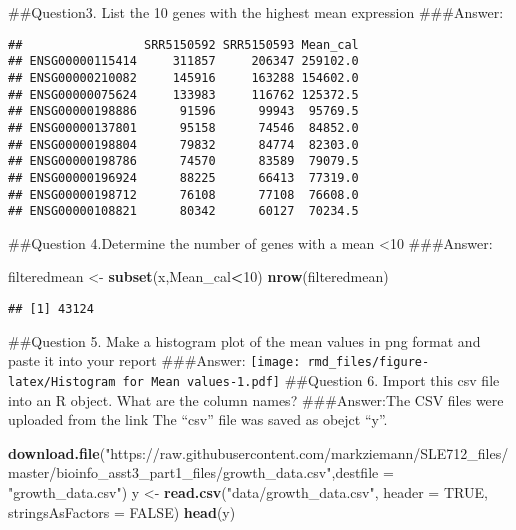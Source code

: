 \documentclass[]{article}
\newenvironment{Shaded}{\begin{snugshade}}{\end{snugshade}}
\newcommand{\DataTypeTok}[1]{\textcolor[rgb]{0.13,0.29,0.53}{#1}}
\newcommand{\DecValTok}[1]{\textcolor[rgb]{0.00,0.00,0.81}{#1}}
\newcommand{\KeywordTok}[1]{\textcolor[rgb]{0.13,0.29,0.53}{\textbf{#1}}}
\newcommand{\NormalTok}[1]{#1}
\newcommand{\OperatorTok}[1]{\textcolor[rgb]{0.81,0.36,0.00}{\textbf{#1}}}
\newcommand{\OtherTok}[1]{\textcolor[rgb]{0.56,0.35,0.01}{#1}}
\newcommand{\StringTok}[1]{\textcolor[rgb]{0.31,0.60,0.02}{#1}}
\begin{document}
\#\#Question3. List the 10 genes with the highest mean expression
\#\#\#Answer:

\begin{Shaded}
\end{Shaded}

\begin{verbatim}
##                 SRR5150592 SRR5150593 Mean_cal
## ENSG00000115414     311857     206347 259102.0
## ENSG00000210082     145916     163288 154602.0
## ENSG00000075624     133983     116762 125372.5
## ENSG00000198886      91596      99943  95769.5
## ENSG00000137801      95158      74546  84852.0
## ENSG00000198804      79832      84774  82303.0
## ENSG00000198786      74570      83589  79079.5
## ENSG00000196924      88225      66413  77319.0
## ENSG00000198712      76108      77108  76608.0
## ENSG00000108821      80342      60127  70234.5
\end{verbatim}

\#\#Question 4.Determine the number of genes with a mean \textless{}10
\#\#\#Answer:

\begin{Shaded}
\begin{Highlighting}[]
\NormalTok{filteredmean <-}\StringTok{ }\KeywordTok{subset}\NormalTok{(x,Mean_cal}\OperatorTok{<}\DecValTok{10}\NormalTok{)}
\KeywordTok{nrow}\NormalTok{(filteredmean)}
\end{Highlighting}
\end{Shaded}

\begin{verbatim}
## [1] 43124
\end{verbatim}

\#\#Question 5. Make a histogram plot of the mean values in png format
and paste it into your report \#\#\#Answer:
\texttt{[image: rmd\_files/figure-latex/Histogram for Mean values-1.pdf]}
\#\#Question 6. Import this csv file into an R object. What are the
column names? \#\#\#Answer:The CSV files were uploaded from the link The
``csv'' file was saved as obejct ``y''.

\begin{Shaded}
\begin{Highlighting}[]
\KeywordTok{download.file}\NormalTok{(}\StringTok{"https://raw.githubusercontent.com/markziemann/SLE712_files/master/bioinfo_asst3_part1_files/growth_data.csv"}\NormalTok{,}\DataTypeTok{destfile =} \StringTok{"growth_data.csv"}\NormalTok{)}
\NormalTok{y <-}\StringTok{ }\KeywordTok{read.csv}\NormalTok{(}\StringTok{"data/growth_data.csv"}\NormalTok{, }\DataTypeTok{header =} \OtherTok{TRUE}\NormalTok{, }\DataTypeTok{stringsAsFactors =} \OtherTok{FALSE}\NormalTok{)}
\KeywordTok{head}\NormalTok{(y)}
\end{Highlighting}
\end{Shaded}
\end{document}

